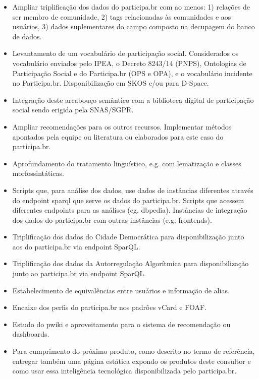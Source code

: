 \documentclass[12pt]{article}
\begin{document}
\begin{itemize}
    \item Ampliar triplificação dos dados do participa.br com ao menos: 1) relações de ser membro de comunidade, 2) tags relacionadas às comunidades e aos usuários, 3) dados suplementares do campo composto na decupagem do banco de dados.
    \item Levantamento de um vocabulário de participação social. Considerados os vocabulário enviados pelo IPEA, o Decreto 8243/14 (PNPS), Ontologias de Participação Social e do Participa.br (OPS e OPA), e o vocabulário incidente no Participa.br. Disponibilização em SKOS e/ou para D-Space.
    \item Integração deste arcabouço semântico com a biblioteca digital de participação social sendo erigida pela SNAS/SGPR.
    \item Ampliar recomendações para os outros recursos. Implementar métodos apontados pela equipe ou literatura ou elaborados para este caso do participa.br.
    \item Aprofundamento do tratamento linguístico, e.g. com lematização e classes morfossintáticas.
    \item Scripts que, para análise dos dados, use dados de instâncias diferentes através do endpoint sparql que serve os dados do participa.br. Scripts que acessem diferentes endpoints para as análises (eg. dbpedia). Instâncias de integração dos dados do participa.br com outras instâncias (e.g. frontends).
    \item Triplificação dos dados do Cidade Democrática para disponibilização junto aos do participa.br via endpoint SparQL.
    \item Triplificação dos dados da Autorregulação Algorítmica para disponibilização junto ao participa.br via endpoint SparQL.
    \item Estabelecimento de equivalências entre usuários e informação de alias.
    \item Encaixe dos perfis do participa.br nos padrões vCard e FOAF.
    \item Estudo do pwiki e aproveitamento para o sistema de recomendação ou dashboards.
    \item Para cumprimento do próximo produto, como descrito no termo de referência, entregar também uma página estática expondo os produtos deste consultor e como usar essa inteligência tecnológica disponibilizada pelo participa.br.
\end{itemize}
\end{document}
